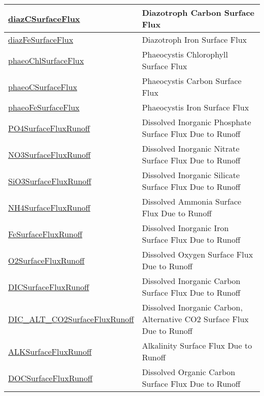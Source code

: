 {\begin{center}
\begin{longtable}{| p{2.0in} | p{4.0in} |}
    \hline
    \hyperref[subsec:var_sec_forcing_diazCSurfaceFlux]{diazCSurfaceFlux} & Diazotroph Carbon Surface Flux \\
    \hline
    \hyperref[subsec:var_sec_forcing_diazFeSurfaceFlux]{diazFeSurfaceFlux} & Diazotroph Iron Surface Flux \\
    \hline
    \hyperref[subsec:var_sec_forcing_phaeoChlSurfaceFlux]{phaeoChlSurfaceFlux} & Phaeocystis Chlorophyll Surface Flux \\
    \hline
    \hyperref[subsec:var_sec_forcing_phaeoCSurfaceFlux]{phaeoCSurfaceFlux} & Phaeocystis Carbon Surface Flux \\
    \hline
    \hyperref[subsec:var_sec_forcing_phaeoFeSurfaceFlux]{phaeoFeSurfaceFlux} & Phaeocystis Iron Surface Flux \\
    \hline
    \hyperref[subsec:var_sec_forcing_PO4SurfaceFluxRunoff]{PO4SurfaceFluxRunoff} & Dissolved Inorganic Phosphate Surface Flux Due to Runoff \\
    \hline
    \hyperref[subsec:var_sec_forcing_NO3SurfaceFluxRunoff]{NO3SurfaceFluxRunoff} & Dissolved Inorganic Nitrate Surface Flux Due to Runoff \\
    \hline
    \hyperref[subsec:var_sec_forcing_SiO3SurfaceFluxRunoff]{SiO3SurfaceFluxRunoff} & Dissolved Inorganic Silicate Surface Flux Due to Runoff \\
    \hline
    \hyperref[subsec:var_sec_forcing_NH4SurfaceFluxRunoff]{NH4SurfaceFluxRunoff} & Dissolved Ammonia Surface Flux Due to Runoff \\
    \hline
    \hyperref[subsec:var_sec_forcing_FeSurfaceFluxRunoff]{FeSurfaceFluxRunoff} & Dissolved Inorganic Iron Surface Flux Due to Runoff \\
    \hline
    \hyperref[subsec:var_sec_forcing_O2SurfaceFluxRunoff]{O2SurfaceFluxRunoff} & Dissolved Oxygen Surface Flux Due to Runoff \\
    \hline
    \hyperref[subsec:var_sec_forcing_DICSurfaceFluxRunoff]{DICSurfaceFluxRunoff} & Dissolved Inorganic Carbon Surface Flux Due to Runoff \\
    \hline
    \hyperref[subsec:var_sec_forcing_DIC_ALT_CO2SurfaceFluxRunoff]{DIC\_ALT\_CO2SurfaceFlux\-Runoff} & Dissolved Inorganic Carbon, Alternative CO2 Surface Flux Due to Runoff \\
    \hline
    \hyperref[subsec:var_sec_forcing_ALKSurfaceFluxRunoff]{ALKSurfaceFluxRunoff} & Alkalinity Surface Flux Due to Runoff \\
    \hline
    \hyperref[subsec:var_sec_forcing_DOCSurfaceFluxRunoff]{DOCSurfaceFluxRunoff} & Dissolved Organic Carbon Surface Flux Due to Runoff \\

\end{longtable}
\end{center}}
